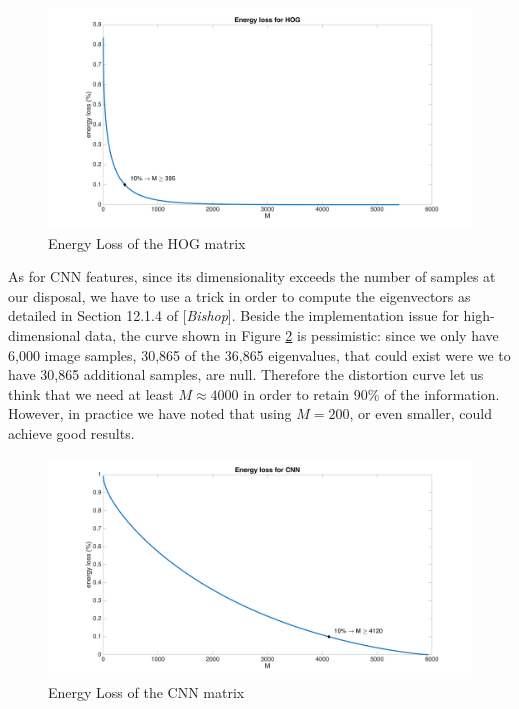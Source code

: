 \documentclass{article} %
\begin{document}
\begin{figure}[h]
  \center
  \includegraphics[width=\textwidth]{figures/distortion_energy_hog}
  \caption{Energy Loss of the HOG matrix}
  \label{fig:distortion-hog}
\end{figure}

As for CNN features, since its dimensionality exceeds the number of samples at our disposal, we have to use a trick in order to compute the eigenvectors as detailed in Section 12.1.4 of [\textit{Bishop}].
Beside the implementation issue for high-dimensional data, the curve shown in Figure \ref{fig:distortion-cnn} is pessimistic: since we only have 6,000 image samples, 30,865 of the 36,865 eigenvalues, that could exist were we to have 30,865 additional samples, are null. Therefore the distortion curve let us think that we need at least $M \approx 4000$ in order to retain 90\% of the information. However, in practice we have noted that using $M = 200$, or even smaller, could achieve good results.

\begin{figure}[h]
  \center
  \includegraphics[width=\textwidth]{figures/distortion_energy_cnn}
  \caption{Energy Loss of the CNN matrix}
  \label{fig:distortion-cnn}
\end{figure}
\end{document}

